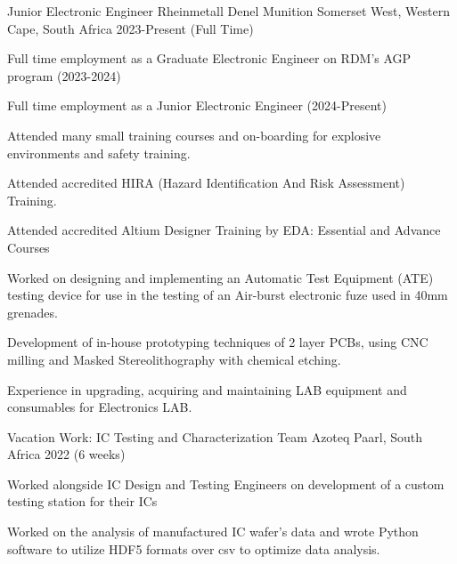 \begin{cventries}
	

\cventry
{Junior Electronic Engineer} %
{Rheinmetall Denel Munition} %
{Somerset West, Western Cape, South Africa} %
{2023-Present (Full Time)} %
{
	\begin{cvitems} %
		\item {Full time employment as a Graduate Electronic Engineer on RDM's AGP program (2023-2024)}
		\item {Full time employment as a Junior Electronic Engineer (2024-Present)}
		\item {Attended many small training courses and on-boarding for explosive environments and safety training.}
		\item {Attended accredited HIRA (Hazard Identification And Risk Assessment) Training.}
		\item {Attended accredited Altium Designer Training by EDA: Essential and Advance Courses}
		\item {Worked on designing and implementing an Automatic Test Equipment (ATE) testing device for use in the testing of an Air-burst electronic fuze used in 40mm grenades.}
		\item {Development of in-house prototyping techniques of 2 layer PCBs, using CNC milling and Masked Stereolithography with chemical etching.}
		\item {Experience in upgrading, acquiring and maintaining LAB equipment and consumables for Electronics LAB.}
	\end{cvitems}
}



  \cventry
{Vacation Work: IC Testing and Characterization Team} %
{Azoteq} %
{Paarl, South Africa} %
{2022 (6 weeks)} %
{
	\begin{cvitems} %
		\item {Worked alongside IC Design and Testing Engineers on development of a custom testing station for their ICs}
		\item {Worked on the analysis of manufactured IC wafer's data and wrote Python software to utilize HDF5 formats over csv to optimize data analysis.}
	\end{cvitems}
}


\end{cventries}
